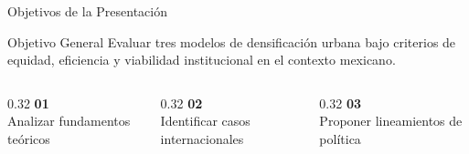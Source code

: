 \begin{frame}{Objetivos de la Presentación}
  \begin{block}{Objetivo General}
    Evaluar tres modelos de densificación urbana bajo criterios de equidad,
    eficiencia y viabilidad institucional en el contexto mexicano.
  \end{block}
  \vspace{0.4cm}
  \begin{columns}[T]
    \begin{column}{0.32\textwidth}
      \centering
      {\color{ColorPrincipal}\Large\textbf{01}}\\[0.1cm]
      {\small Analizar fundamentos teóricos}
    \end{column}
    \begin{column}{0.32\textwidth}
      \centering
      {\color{ColorPrincipal}\Large\textbf{02}}\\[0.1cm]
      {\small Identificar casos internacionales}
    \end{column}
    \begin{column}{0.32\textwidth}
      \centering
      {\color{ColorPrincipal}\Large\textbf{03}}\\[0.1cm]
      {\small Proponer lineamientos de política}
    \end{column}
  \end{columns}
\end{frame}
